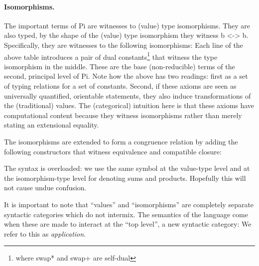 \documentclass{llncs}
\begin{document}
\paragraph*{Isomorphisms.} The important terms of {{Pi}} are witnesses to
(value) type isomorphisms.  They are also typed, by the shape of the (value)
type isomorphism they witness {{b <-> b}}.  Specifically, they are witnesses to
the following isomorphisms:
\noindent Each line of the above table introduces a pair of dual
constants\footnote{where {{swap*}} and {{swap+}} are self-dual} that witness
the type isomorphism in the middle.  These are the base (non-reducible) terms
of the second, principal level of {{Pi}}. Note how the above has two
readings: first as a set of typing relations for a set of constants. Second,
if these axioms are seen as universally quantified, orientable statements,
they also induce transformations of the (traditional) values. The
(categorical) intuition here is that these axioms have computational content
because they witness isomorphisms rather than merely stating an extensional
equality.

The isomorphisms are extended to form a congruence relation by adding the
following constructors that witness equivalence and compatible closure:

%
%
%
\noindent The syntax is overloaded: we use the same symbol at the value-type level
and at the isomorphism-type level for denoting sums and products.  Hopefully
this will not cause undue confusion.

It is important to note that ``values'' and ``isomorphisms'' are completely
separate syntactic categories which do not intermix. The semantics of the
language come when these are made to interact at the ``top level'', a new
syntactic category:
\noindent We refer to this as \emph{application}.
\end{document}
